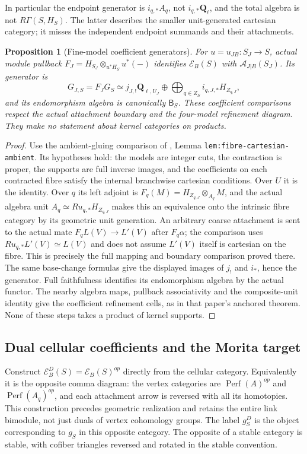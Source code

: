 \documentclass[11pt]{article}
\newtheorem{proposition}{Proposition}[section]
\theoremstyle{definition}
\theoremstyle{remark}
\newcommand{\Q}{\mathbf Q_\ell}
\newcommand{\Perf}{\operatorname{Perf}}
\begin{document}
In particular the endpoint generator is $i_{q,*}A_q$, not
$i_{q,*}\Q$, and the total algebra is not $R\Gamma(S,H_S)$.
The latter describes the smaller unit-generated cartesian category;
it misses the independent endpoint summands and their attachments.

\begin{proposition}[Fine-model coefficient generators]
\label{prop:fine-generators}
For $u=u_{JB}:S_J\to S$, actual module pullback
$F_J=H_{S_J}\otimes_{u^*H_S}u^*(-)$ identifies
$\mathcal E_B(S)$ with $\mathcal A_{J|B}(S_J)$.
Its generator is
\[
 G_{J,S}=F_JG_S
   \simeq j_{J,!}\mathbf Q_{\ell,U_J}\oplus
                   \bigoplus_{q\in Z_S}i_{q,J,*}H_{Z_{q,J}},
\]
and its endomorphism algebra is canonically $\mathsf B_S$.
These coefficient comparisons respect the actual attachment boundary
and the four-model refinement diagram.  They make no statement about
kernel categories on products.
\end{proposition}
\begin{proof}
Use the ambient-gluing comparison of \cite{Refinement},
Lemma \texttt{lem:fibre-cartesian-ambient}.  Its hypotheses hold:
the models are integer cuts, the contraction is proper, the supports
are full inverse images, and the coefficients on each contracted
fibre satisfy the internal branchwise cartesian conditions.
Over $U$ it is the identity.  Over $q$ its left adjoint is
$F_q(M)=H_{Z_{q,J}}\otimes_{A_q}M$, and the actual algebra unit
$A_q\simeq Ru_{q,*}H_{Z_{q,J}}$ makes this an equivalence onto the
intrinsic fibre category by its geometric unit generation.
An arbitrary coarse attachment is sent to the actual mate
$F_qL(V)\to L'(V)$ after $F_q\alpha$; the comparison uses
$Ru_{q,*}L'(V)\simeq L(V)$ and does not assume $L'(V)$ itself
is cartesian on the fibre.  This is precisely the full mapping and
boundary comparison proved there.
The same base-change formulas give the displayed images of $j_!$
and $i_*$, hence the generator.  Full faithfulness identifies its
endomorphism algebra by the actual functor.  The nearby algebra maps,
pullback associativity and the composite-unit identity give the
coefficient refinement cells, as in that paper's anchored theorem.
None of these steps takes a product of kernel supports.
\end{proof}

\subsection{Dual cellular coefficients and the Morita target}
Construct $\mathcal E_B^D(S)=\mathcal E_B(S)^{op}$ directly from the
cellular category.  Equivalently it is the opposite comma diagram:
the vertex categories are $\Perf(A)^{op}$ and $\Perf(A_q)^{op}$,
and each attachment arrow is reversed with all its homotopies.
This construction precedes geometric realization and retains the
entire link bimodule, not just duals of vertex cohomology groups.
The label $g_S^D$ is the object corresponding to $g_S$ in this
opposite category.  The opposite of a stable category is stable,
with cofiber triangles reversed and rotated in the stable convention.
\end{document}
